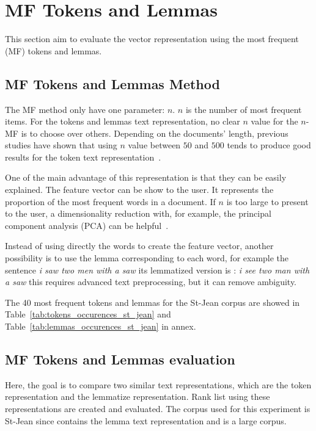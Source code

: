 \section{MF Tokens and Lemmas \label{sec:tokens_lemmas}}

This section aim to evaluate the vector representation using the most frequent (MF) tokens and lemmas.

\subsection{MF Tokens and Lemmas Method}

The MF method only have one parameter: $n$.
$n$ is the number of most frequent items.
For the tokens and lemmas text representation, no clear $n$ value for the $n$-MF is to choose over others.
Depending on the documents' length, previous studies have shown that using $n$ value between $50$ and $500$ tends to produce good results for the token text representation~\cite{savoy_text_representation}.

One of the main advantage of this representation is that they can be easily explained.
The feature vector can be show to the user.
It represents the proportion of the most frequent words in a document.
If $n$ is too large to present to the user, a dimensionality reduction with, for example, the principal component analysis (PCA) can be helpful~\cite{savoy_stylo}.

Instead of using directly the words to create the feature vector, another possibility is to use the lemma corresponding to each word, for example the sentence \textit{i saw two men with a saw} its lemmatized version is : \textit{i see two man with a saw} this requires advanced text preprocessing, but it can remove ambiguity.

The 40 most frequent tokens and lemmas for the St-Jean corpus are showed in Table~\ref{tab:tokens_occurences_st_jean} and Table~\ref{tab:lemmas_occurences_st_jean} in annex.

\subsection{MF Tokens and Lemmas evaluation \label{sec:tokens_lemmas_eval}}

Here, the goal is to compare two similar text representations, which are the token representation and the lemmatize representation.
Rank list using these representations are created and evaluated.
The corpus used for this experiment is St-Jean since contains the lemma text representation and is a large corpus.

